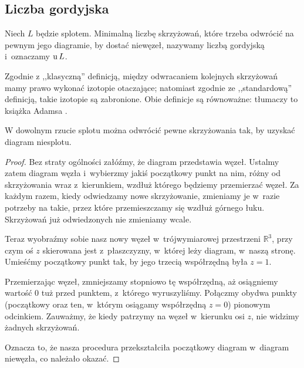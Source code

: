 
\subsection{Liczba gordyjska}
%

\begin{definition}
    Niech $L$ będzie splotem.
    Minimalną liczbę skrzyżowań, które trzeba odwrócić na pewnym jego diagramie, by dostać niewęzeł, nazywamy liczbą gordyjską i~oznaczamy $\operatorname{u} L$.
\end{definition}

Zgodnie z ,,klasyczną'' definicją, między odwracaniem kolejnych skrzyżowań mamy prawo wykonać izotopie otaczające; natomiast zgodnie ze ,,standardową'' definicją, takie izotopie są zabronione.
Obie definicje są równoważne: tłumaczy to książka Adamsa \cite[s. 58]{adams1994}.

\begin{lemma}
\label{lem:unknotting_well_defined}%
    W dowolnym rzucie splotu można odwrócić pewne skrzyżowania tak, by uzyskać diagram niesplotu.
\end{lemma}

\begin{proof}
    Bez straty ogólności załóźmy, że diagram przedstawia węzeł.
    Ustalmy zatem diagram węzła i~wybierzmy jakiś początkowy punkt na nim, różny od skrzyżowania wraz z~kierunkiem, wzdłuż którego będziemy przemierzać węzeł.
    Za każdym razem, kiedy odwiedzamy nowe skrzyżowanie, zmieniamy je w~razie potrzeby na takie, przez które przemieszczamy się wzdłuż górnego łuku.
    Skrzyżowań już odwiedzonych nie zmieniamy wcale.

    Teraz wyobraźmy sobie nasz nowy węzeł w~trójwymiarowej przestrzeni $\mathbb R^3$, przy czym oś $z$ skierowana jest z~płaszczyzny, w~której leży diagram, w~naszą stronę.
    Umieśćmy początkowy punkt tak, by jego trzecią współrzędną była $z = 1$.

    Przemierzając węzeł, zmniejszamy stopniowo tę współrzędną, aż osiągniemy wartość $0$ tuż przed punktem, z~którego wyruszyliśmy.
    Połączmy obydwa punkty (początkowy oraz ten, w~którym osiągamy współrzędną $z = 0$) pionowym odcinkiem.
    Zauważmy, że kiedy patrzymy na węzeł w~kierunku osi $z$, nie widzimy żadnych skrzyżowań.

    Oznacza to, że nasza procedura przekształciła początkowy diagram w~diagram niewęzła, co należało okazać.
\end{proof}

